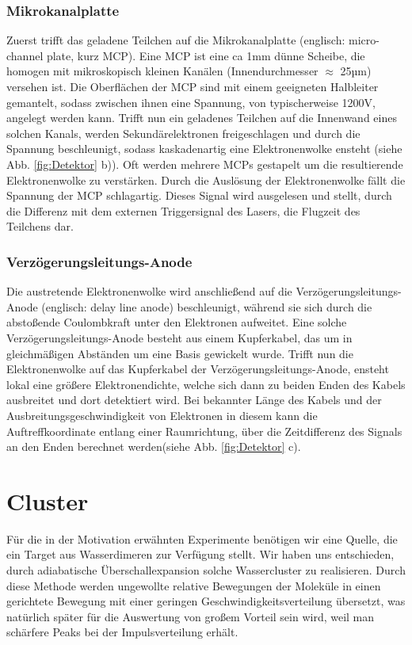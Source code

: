 \subsubsection{Mikrokanalplatte}
Zuerst trifft das geladene Teilchen auf die Mikrokanalplatte (englisch: micro-channel plate, kurz MCP). Eine MCP ist eine ca 1mm dünne Scheibe, die homogen mit mikroskopisch kleinen Kanälen (Innendurchmesser $\approx$ 25µm) versehen ist. Die Oberflächen der MCP sind mit einem geeigneten Halbleiter gemantelt, sodass zwischen ihnen eine Spannung, von typischerweise 1200V, angelegt werden kann. Trifft nun ein geladenes Teilchen auf die Innenwand eines solchen Kanals, werden Sekundärelektronen freigeschlagen und durch die Spannung beschleunigt, sodass kaskadenartig eine Elektronenwolke ensteht (siehe Abb. \ref{fig:Detektor} b)). Oft werden mehrere MCPs gestapelt um die resultierende Elektronenwolke zu verstärken. Durch die Auslösung der Elektronenwolke fällt die Spannung der MCP schlagartig. Dieses Signal wird ausgelesen und stellt, durch die Differenz mit dem externen Triggersignal des Lasers, die Flugzeit des Teilchens dar. 

\subsubsection{Verzögerungsleitungs-Anode}

Die austretende Elektronenwolke wird anschließend auf die Verzögerungsleitungs-Anode (englisch: delay line anode) beschleunigt, während sie sich durch die abstoßende Coulombkraft unter den Elektronen aufweitet. Eine solche Verzögerungsleitungs-Anode besteht aus einem Kupferkabel, das um in gleichmäßigen Abständen um eine Basis gewickelt wurde. Trifft nun die Elektronenwolke auf das Kupferkabel der Verzögerungsleitungs-Anode, ensteht lokal eine größere Elektronendichte, welche sich dann zu beiden Enden des Kabels ausbreitet und dort detektiert wird. Bei bekannter Länge des Kabels und der Ausbreitungsgeschwindigkeit von Elektronen in diesem kann die Auftreffkoordinate entlang einer Raumrichtung, über die Zeitdifferenz des Signals an den Enden berechnet werden(siehe Abb. \ref{fig:Detektor} c).




\newpage
\section{Cluster}

Für die in der Motivation erwähnten Experimente benötigen wir eine Quelle, die ein Target aus Wasserdimeren zur Verfügung stellt. Wir haben uns entschieden, durch adiabatische Überschallexpansion solche Wassercluster zu realisieren. Durch diese Methode werden ungewollte relative Bewegungen der Moleküle in einen gerichtete Bewegung mit einer geringen Geschwindigkeitsverteilung übersetzt, was natürlich später für die Auswertung von großem Vorteil sein wird, weil man schärfere Peaks bei der Impulsverteilung erhält.


